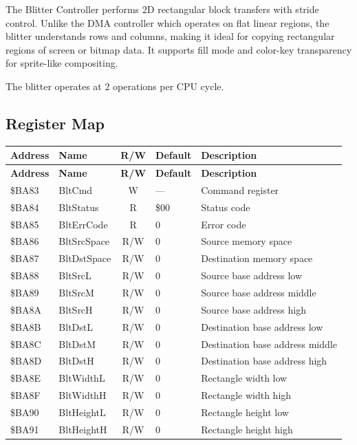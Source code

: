 The Blitter Controller performs 2D rectangular block transfers with stride
control.  Unlike the DMA controller which operates on flat linear regions,
the blitter understands rows and columns, making it ideal for copying
rectangular regions of screen or bitmap data.  It supports fill mode and
color-key transparency for sprite-like compositing.

The blitter operates at 2 operations per CPU cycle.

\subsection{Register Map}

\begin{center}
\small
\begin{longtable}{@{}llcll@{}}
\toprule
\textbf{Address} & \textbf{Name} & \textbf{R/W} & \textbf{Default} & \textbf{Description} \\
\midrule
\endfirsthead
\toprule
\textbf{Address} & \textbf{Name} & \textbf{R/W} & \textbf{Default} & \textbf{Description} \\
\midrule
\endhead
\$BA83 & BltCmd       & W   & ---  & Command register \\
\$BA84 & BltStatus    & R   & \$00 & Status code \\
\$BA85 & BltErrCode   & R   & 0    & Error code \\
\$BA86 & BltSrcSpace  & R/W & 0    & Source memory space \\
\$BA87 & BltDstSpace  & R/W & 0    & Destination memory space \\
\$BA88 & BltSrcL      & R/W & 0    & Source base address low \\
\$BA89 & BltSrcM      & R/W & 0    & Source base address middle \\
\$BA8A & BltSrcH      & R/W & 0    & Source base address high \\
\$BA8B & BltDstL      & R/W & 0    & Destination base address low \\
\$BA8C & BltDstM      & R/W & 0    & Destination base address middle \\
\$BA8D & BltDstH      & R/W & 0    & Destination base address high \\
\$BA8E & BltWidthL    & R/W & 0    & Rectangle width low \\
\$BA8F & BltWidthH    & R/W & 0    & Rectangle width high \\
\$BA90 & BltHeightL   & R/W & 0    & Rectangle height low \\
\$BA91 & BltHeightH   & R/W & 0    & Rectangle height high \\

\end{longtable}
\end{center}

